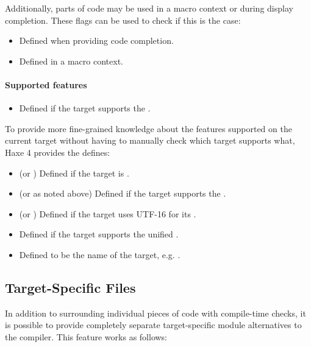 Additionally, parts of code may be used in a macro context or during display completion. These flags can be used to check if this is the case:

\begin{itemize}
	\item[\ic{display}] Defined when providing code completion.
	\item[\ic{macro}] Defined in a macro context.
\end{itemize}

\paragraph{Supported features}

\begin{itemize}
	\item[\ic{sys}] Defined if the target supports the .
\end{itemize}


To provide more fine-grained knowledge about the features supported on the current target without having to manually check which target supports what, Haxe 4 provides the  defines:

\begin{itemize}
	\item[\ic{target.static}] (or ) Defined if the target is .
	\item[\ic{target.sys}] (or  as noted above) Defined if the target supports the .
	\item[\ic{target.utf16}] (or ) Defined if the target uses UTF-16 for its .
	\item[\ic{target.threaded}] Defined if the target supports the unified .
	\item[\ic{target.name}] Defined to be the name of the target, e.g. .
\end{itemize}

\subsection{Target-Specific Files}
\label{lf-target-specific-files}

In addition to surrounding individual pieces of code with compile-time checks, it is possible to provide completely separate target-specific module alternatives to the compiler. This feature works as follows:

